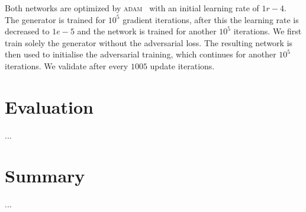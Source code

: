 \documentclass{scrartcl}
\begin{document}
Both networks are optimized by \textsc{adam}~\cite{adam} with an initial learning rate of $1r-4$.
The generator is trained for $10^5$ gradient iterations, after this the learning rate is decreased to $1e-5$ and the network is trained for another $10^5$ iterations.
We first train solely the generator without the adversarial loss.
The resulting network is then used to initialise the adversarial training, which continues for another $10^5$ iterations.
We validate after every $1005$ update iterations.



\section{Evaluation}
...
\section{Summary}
...

\printbibliography
\end{document}
